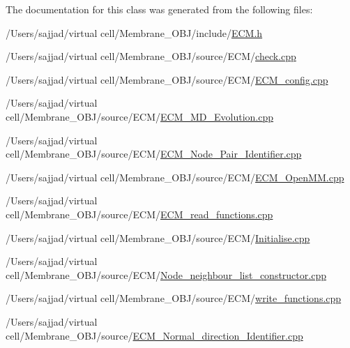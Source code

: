 The documentation for this class was generated from the following files\+:\begin{DoxyCompactItemize}
\item 
/\+Users/sajjad/virtual cell/\+Membrane\+\_\+\+O\+B\+J/include/\mbox{\hyperlink{ECM_8h}{E\+C\+M.\+h}}\item 
/\+Users/sajjad/virtual cell/\+Membrane\+\_\+\+O\+B\+J/source/\+E\+C\+M/\mbox{\hyperlink{ECM_2check_8cpp}{check.\+cpp}}\item 
/\+Users/sajjad/virtual cell/\+Membrane\+\_\+\+O\+B\+J/source/\+E\+C\+M/\mbox{\hyperlink{ECM__config_8cpp}{E\+C\+M\+\_\+config.\+cpp}}\item 
/\+Users/sajjad/virtual cell/\+Membrane\+\_\+\+O\+B\+J/source/\+E\+C\+M/\mbox{\hyperlink{ECM__MD__Evolution_8cpp}{E\+C\+M\+\_\+\+M\+D\+\_\+\+Evolution.\+cpp}}\item 
/\+Users/sajjad/virtual cell/\+Membrane\+\_\+\+O\+B\+J/source/\+E\+C\+M/\mbox{\hyperlink{ECM__Node__Pair__Identifier_8cpp}{E\+C\+M\+\_\+\+Node\+\_\+\+Pair\+\_\+\+Identifier.\+cpp}}\item 
/\+Users/sajjad/virtual cell/\+Membrane\+\_\+\+O\+B\+J/source/\+E\+C\+M/\mbox{\hyperlink{ECM__OpenMM_8cpp}{E\+C\+M\+\_\+\+Open\+M\+M.\+cpp}}\item 
/\+Users/sajjad/virtual cell/\+Membrane\+\_\+\+O\+B\+J/source/\+E\+C\+M/\mbox{\hyperlink{ECM__read__functions_8cpp}{E\+C\+M\+\_\+read\+\_\+functions.\+cpp}}\item 
/\+Users/sajjad/virtual cell/\+Membrane\+\_\+\+O\+B\+J/source/\+E\+C\+M/\mbox{\hyperlink{ECM_2Initialise_8cpp}{Initialise.\+cpp}}\item 
/\+Users/sajjad/virtual cell/\+Membrane\+\_\+\+O\+B\+J/source/\+E\+C\+M/\mbox{\hyperlink{Node__neighbour__list__constructor_8cpp}{Node\+\_\+neighbour\+\_\+list\+\_\+constructor.\+cpp}}\item 
/\+Users/sajjad/virtual cell/\+Membrane\+\_\+\+O\+B\+J/source/\+E\+C\+M/\mbox{\hyperlink{ECM_2write__functions_8cpp}{write\+\_\+functions.\+cpp}}\item 
/\+Users/sajjad/virtual cell/\+Membrane\+\_\+\+O\+B\+J/source/\mbox{\hyperlink{ECM__Normal__direction__Identifier_8cpp}{E\+C\+M\+\_\+\+Normal\+\_\+direction\+\_\+\+Identifier.\+cpp}}\end{DoxyCompactItemize}
